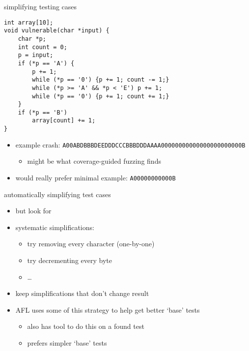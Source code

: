 \begin{frame}[fragile,label=covMinEx]{simplifying testing cases}
\begin{lstlisting}[style=script]
int array[10];
void vulnerable(char *input) {
    char *p;
    int count = 0;
    p = input;
    if (*p == 'A') { 
        p += 1;
        while (*p == '0') {p += 1; count -= 1;}
        while (*p >= 'A' && *p < 'E') p += 1;
        while (*p == '0') {p += 1; count += 1;}
    }
    if (*p == 'B')
        array[count] += 1;
}
\end{lstlisting}
\begin{itemize}
\item example crash: {\small\texttt{A00ABDBBBDEEDDDCCCBBBDDDAAAA00000000000000000000000B}}
    \begin{itemize}
    \item might be what coverage-guided fuzzing finds
    \end{itemize}
\item would really prefer minimal example: \texttt{A00000000000B}
\end{itemize}
\end{frame}


\begin{frame}[fragile,label=covMin]{automatically simplifying test cases}
    \begin{itemize}
        \item but look for 
        \item systematic simplifications:
            \begin{itemize}
                \item try removing every character (one-by-one)
                \item try decrementing every byte
                \item \ldots
            \end{itemize}
        \item keep simplifications that don't change result
        \item AFL uses some of this strategy to help get better `base' tests
            \begin{itemize}
            \item also has tool to do this on a found test
            \item prefers simpler `base' tests
            \end{itemize}
    \end{itemize}
\end{frame}
